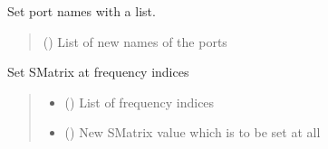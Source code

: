 \documentclass[letterpaper,10pt,english]{sphinxmanual}
\begin{document}
\begin{fulllineitems}

\begin{fulllineitems}
\label{\detokenize{touchstone:touchstone.spfile.set_port_names}}
\pysigstartsignatures
{}
\pysigstopsignatures
\sphinxAtStartPar
Set port names with a list.
\begin{quote}\begin{description}
\sphinxAtStartPar
{} () \textendash{} List of new names of the ports

\end{description}\end{quote}

\end{fulllineitems}


\begin{fulllineitems}
\label{\detokenize{touchstone:touchstone.spfile.set_smatrix_at_frequency_point}}
\pysigstartsignatures
{}
\pysigstopsignatures
\sphinxAtStartPar
Set S\sphinxhyphen{}Matrix at frequency indices
\begin{quote}\begin{description}
\begin{itemize}
\item {}
\sphinxAtStartPar
{} () \textendash{} List of frequency indices

\item {}
\sphinxAtStartPar
{} () \textendash{} New S\sphinxhyphen{}Matrix value which is to be set at all 

\end{itemize}

\end{description}\end{quote}


\end{fulllineitems}
\end{fulllineitems}
\end{document}
